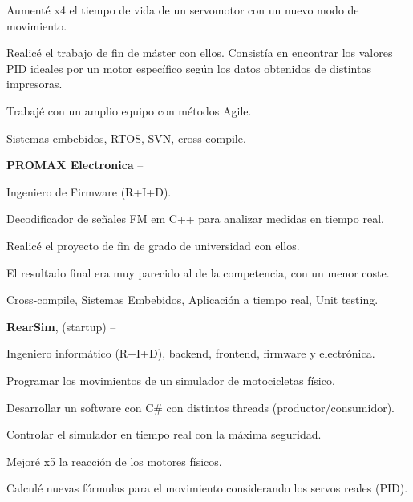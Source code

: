 \documentclass[letterpaper,MMMyyyy,nonstopmode]{simpleresumecv}
\newcommand\tab[1][0.5cm]{\hspace*{#1}}
\begin{document}
\begin{Body}
\tab Aumenté x4 el tiempo de vida de un servomotor con un nuevo modo de movimiento.

\tab Realicé el trabajo de fin de máster con ellos. Consistía en encontrar los valores PID
\tab \tab   ideales por un motor específico según los datos obtenidos de distintas impresoras.

\tab Trabajé con un amplio equipo con métodos Agile. 

\tab Sistemas embebidos, RTOS, SVN, cross-compile. 

\Gap


{\textbf{PROMAX Electronica}}
\hfill
{} --

\tab Ingeniero de Firmware (R+I+D).

\tab Decodificador de señales FM em C++ para analizar medidas en tiempo real. 

\tab Realicé el proyecto de fin de grado de universidad con ellos.

\tab El resultado final era muy parecido al de la competencia, con un menor coste.

\tab Cross-compile, Sistemas Embebidos, Aplicación a tiempo real, Unit testing. 

\Gap


{\textbf{RearSim}}, (startup)
\hfill
{} --

\tab Ingeniero informático (R+I+D), backend, frontend, firmware y electrónica. 

\tab Programar los movimientos de un simulador de motocicletas físico. 

\tab Desarrollar un software con C\# con distintos threads (productor/consumidor).

\tab Controlar el simulador en tiempo real con la máxima seguridad.

\tab Mejoré x5 la reacción de los motores físicos. 

\tab Calculé nuevas fórmulas para el movimiento considerando los servos reales (PID).


\end{Body}
\end{document}
